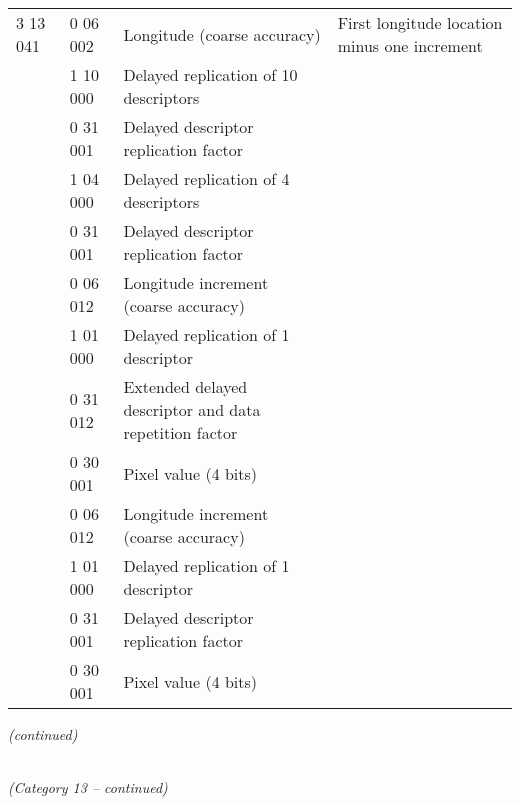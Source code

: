 \begin{longtable}[]{@{}llll@{}}
3 13 041 & 0 06 002 & Longitude (coarse accuracy) & First longitude location minus one increment\tabularnewline
& 1 10 000 & Delayed replication of 10 descriptors &\tabularnewline
& 0 31 001 & Delayed descriptor replication factor &\tabularnewline
& 1 04 000 & Delayed replication of 4 descriptors &\tabularnewline
& 0 31 001 & Delayed descriptor replication factor &\tabularnewline
& 0 06 012 & Longitude increment (coarse accuracy) &\tabularnewline
& 1 01 000 & Delayed replication of 1 descriptor &\tabularnewline
& 0 31 012 & Extended delayed descriptor and data repetition factor &\tabularnewline
& 0 30 001 & Pixel value (4 bits) &\tabularnewline
& 0 06 012 & Longitude increment (coarse accuracy) &\tabularnewline
& 1 01 000 & Delayed replication of 1 descriptor &\tabularnewline
& 0 31 001 & Delayed descriptor replication factor &\tabularnewline
& 0 30 001 & Pixel value (4 bits) &\tabularnewline
\bottomrule
\end{longtable}

\emph{(continued)}

\emph{\\
(Category 13 -- continued)}

